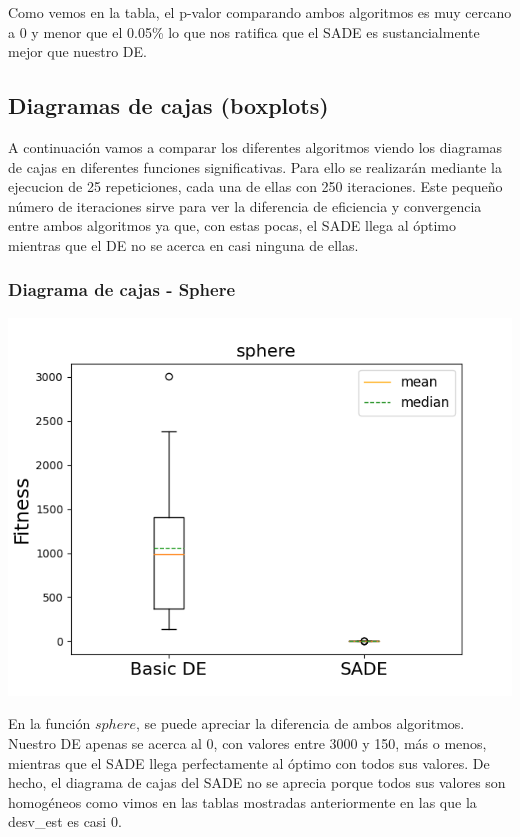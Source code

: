 \documentclass[11pt, a4paper, titlepage]{article}
\begin{document}
\vspace{5mm}

Como vemos en la tabla, el p-valor comparando ambos algoritmos es muy cercano a 0 y menor que el 0.05\% lo que nos ratifica que el SADE es sustancialmente mejor que nuestro DE.
\subsection{Diagramas de cajas (boxplots)}
A continuación vamos a comparar los diferentes algoritmos viendo los diagramas de cajas en diferentes funciones significativas. Para ello se realizarán mediante la ejecucion de 25 repeticiones, cada una de ellas con 250 iteraciones. Este pequeño número de iteraciones sirve para ver la diferencia de eficiencia y convergencia entre ambos algoritmos ya que, con estas pocas, el SADE llega al óptimo mientras que el DE no se acerca en casi ninguna de ellas.
\subsubsection{Diagrama de cajas - Sphere}
\begin{center}
\includegraphics[scale=0.85]{sphere}
\end{center}
En la función $sphere$, se puede apreciar la diferencia de ambos algoritmos. Nuestro DE apenas se acerca al 0, con valores entre 3000 y 150, más o menos, mientras que el SADE llega perfectamente al óptimo con todos sus valores. De hecho, el diagrama de cajas del SADE no se aprecia porque todos sus valores son homogéneos como vimos en las tablas mostradas anteriormente en las que la desv\_est es casi 0.
\end{document}
